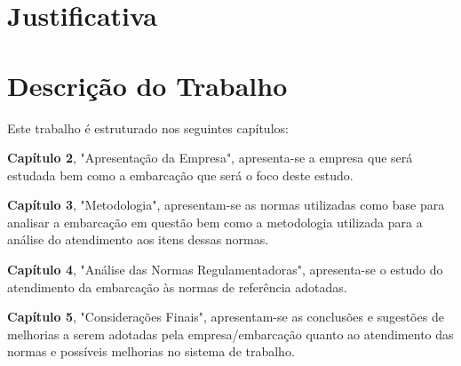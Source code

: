 \section{Justificativa}

\section{Descrição do Trabalho}
Este trabalho é estruturado nos seguintes capítulos:

\textbf{Capítulo 2}, "Apresentação da Empresa", apresenta-se a empresa que será estudada bem como a embarcação que será o foco deste estudo.

\textbf{Capítulo 3}, "Metodologia", apresentam-se as normas utilizadas como base para analisar a embarcação em questão bem como a  metodologia utilizada para a análise do atendimento aos itens dessas normas. 

\textbf{Capítulo 4}, "Análise das Normas Regulamentadoras", apresenta-se o estudo do atendimento da embarcação às normas de referência adotadas. 

\textbf{Capítulo 5}, "Considerações Finais",  apresentam-se as conclusões e sugestões de melhorias a serem adotadas pela empresa/embarcação quanto ao atendimento das normas e possíveis melhorias no sistema de trabalho.


